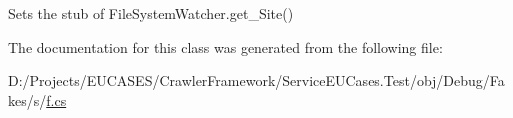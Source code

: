 Sets the stub of File\-System\-Watcher.\-get\-\_\-\-Site()



The documentation for this class was generated from the following file\-:\begin{DoxyCompactItemize}
\item 
D\-:/\-Projects/\-E\-U\-C\-A\-S\-E\-S/\-Crawler\-Framework/\-Service\-E\-U\-Cases.\-Test/obj/\-Debug/\-Fakes/s/\hyperlink{s_2f_8cs}{f.\-cs}\end{DoxyCompactItemize}
